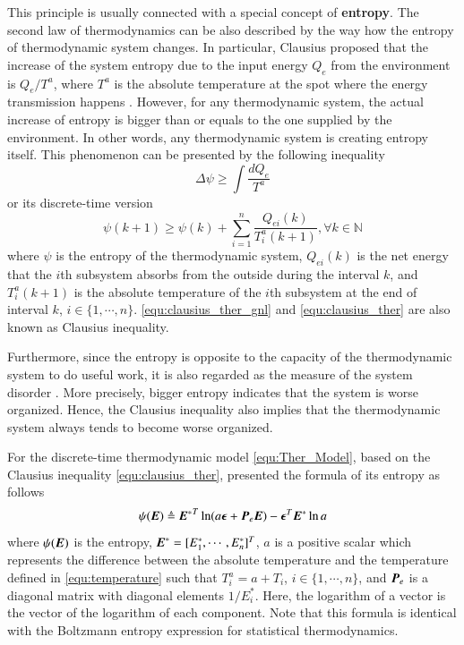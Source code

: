\documentclass[preprint,authoryear,12pt]{elsarticle}
\renewcommand{\vec}[1]{\mbox{\boldmath$#1$}}
\newcommand{\mat}[1]{\mbox{\boldmath$#1$}}
\begin{document}
This principle is usually connected with a special concept of
\textbf{entropy}. The second law of thermodynamics can be also
described by the way how the entropy of thermodynamic system changes.
In particular, Clausius proposed that the increase of the system
entropy due to the input energy $Q_e$ from the environment is
$Q_e/T^a$, where $T^a$ is the absolute temperature at the spot where
the energy transmission happens \citep{clausius_mechanical_1867}.
However, for any thermodynamic system, the actual increase of entropy
is bigger than or equals to the one supplied by the environment. In
other words, any thermodynamic system is creating entropy itself.
This phenomenon can be presented by the following inequality
\begin{equation}\label{equ:clausius_ther_gnl}
\Delta \psi \ge \int\frac{dQ_e}{T^a}
\end{equation}
or its discrete-time version \citep{haddad_thermodynamic_2005}
\begin{equation}\label{equ:clausius_ther}
\psi(k+1) \ge \psi(k)+\sum_{i=1}^{n}\frac{Q_{ei}(k)}{T^a_i(k+1)},
\forall k\in\mathbb{N}
\end{equation}
where $\psi$ is the entropy of the thermodynamic system, $Q_{ei}(k)$
is the net energy that the $i$th subsystem absorbs from the outside
during the interval $k$, and $T^a_i(k+1)$ is the absolute temperature
of the $i$th subsystem at the end of interval $k$,
$i\in\{1,\cdots,n\}$. \eqref{equ:clausius_ther_gnl} and
\eqref{equ:clausius_ther} are also known as Clausius inequality.

Furthermore, since the entropy is opposite to the capacity of the
thermodynamic system to do useful work, it is also regarded as the
measure of the system disorder \citep{balmakov_entropy_2001}. More
precisely, bigger entropy indicates that the system is worse
organized. Hence, the Clausius inequality also implies that the
thermodynamic system always tends to become worse organized.

For the discrete-time thermodynamic model \eqref{equ:Ther_Model},
based on the Clausius inequality \eqref{equ:clausius_ther},
\citet{haddad_thermodynamic_2005} presented the formula of its
entropy as follows
\begin{equation}
\psi(\vec{E}) \triangleq{\vec{E}^*}^T \ln
(a\vec{\epsilon}+\mat{P}_e\vec{E}) -\vec{\epsilon}^T\vec{E}^*\ln a
\label{equ:Ther_entropy}
\end{equation}
where $\psi(\vec{E})$ is the entropy,
$\vec{E}^*=[E^*_1,\cdots,E^*_n]^T$, $a$ is a positive scalar which
represents the difference between the absolute temperature and the
temperature defined in \eqref{equ:temperature} such that
$T^a_i=a+T_i$, $i\in\{1,\cdots,n\}$, and $\mat{P}_e$ is a diagonal
matrix with diagonal elements $1/E^*_i$. Here, the logarithm of a
vector is the vector of the logarithm of each component.
Note that this formula is identical with the Boltzmann entropy
expression for statistical thermodynamics. 
\end{document}
